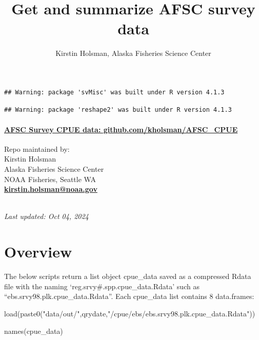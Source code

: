 \documentclass[
]{article}
\title{Get and summarize AFSC survey data}
\author{Kirstin Holsman, Alaska Fisheries Science Center}
\date{}
\newenvironment{Shaded}{\begin{snugshade}}{\end{snugshade}}
\newcommand{\FunctionTok}[1]{\textcolor[rgb]{0.00,0.00,0.00}{#1}}
\newcommand{\NormalTok}[1]{#1}
\newcommand{\StringTok}[1]{\textcolor[rgb]{0.31,0.60,0.02}{#1}}
\begin{document}
\maketitle

{
\setcounter{tocdepth}{2}
\tableofcontents
}
\begin{verbatim}
## Warning: package 'svMisc' was built under R version 4.1.3
\end{verbatim}

\begin{verbatim}
## Warning: package 'reshape2' was built under R version 4.1.3
\end{verbatim}

\hypertarget{afsc-survey-cpue-data-github.comkholsmanafsc_cpue}{%
\paragraph{\texorpdfstring{\href{https://github.com/kholsman/AFSC_CPUE}{\textbf{AFSC
Survey CPUE data:
github.com/kholsman/AFSC\_CPUE}}}{AFSC Survey CPUE data: github.com/kholsman/AFSC\_CPUE}}\label{afsc-survey-cpue-data-github.comkholsmanafsc_cpue}}

Repo maintained by:\\
Kirstin Holsman\\
Alaska Fisheries Science Center\\
NOAA Fisheries, Seattle WA\\
\textbf{\url{kirstin.holsman@noaa.gov}}\strut \\
\emph{Last updated: Oct 04, 2024}

\hypertarget{overview}{%
\section{Overview}\label{overview}}

The below scripts return a list object cpue\_data saved as a compressed
Rdata file with the naming `reg.srvy\#.spp.cpue\_data.Rdata' such as
``ebs.srvy98.plk.cpue\_data.Rdata''. Each cpue\_data list contains 8
data.frames:

\begin{Shaded}
\begin{Highlighting}[]
\FunctionTok{load}\NormalTok{(}\FunctionTok{paste0}\NormalTok{(}\StringTok{"data/out/"}\NormalTok{,qrydate,}\StringTok{"/cpue/ebs/ebs.srvy98.plk.cpue\_data.Rdata"}\NormalTok{))}

\FunctionTok{names}\NormalTok{(cpue\_data)}
\end{Highlighting}
\end{Shaded}
\end{document}
